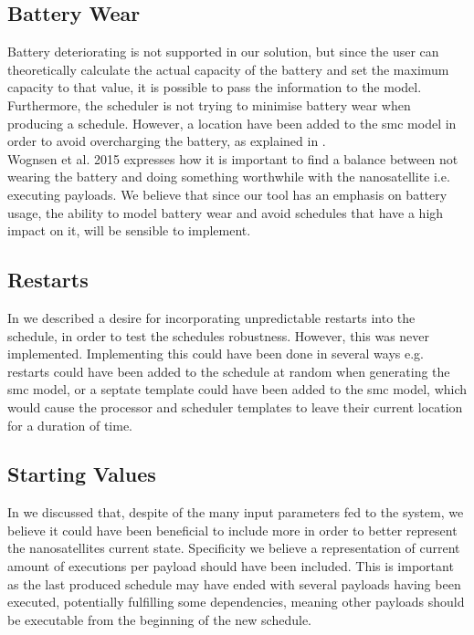 \subsection*{Battery Wear}
Battery deteriorating is not supported in our solution, but since the user can theoretically calculate the actual capacity of the battery and set the maximum capacity to that value, it is possible to pass the information to the model. Furthermore, the scheduler is not trying to minimise battery wear when producing a schedule. However, a location have been added to the \gls{smc} model in order to avoid overcharging the battery, as explained in .\\
Wognsen et al. 2015\cite{score_function} expresses how it is important to find a balance between not wearing the battery and doing something worthwhile with the nanosatellite i.e. executing payloads. We believe that since our tool has an emphasis on battery usage, the ability to model battery wear and avoid schedules that have a high impact on it, will be sensible to implement. 

\subsection*{Restarts}
In  we described a desire for incorporating unpredictable restarts into the schedule, in order to test the schedules robustness. However, this was never implemented. Implementing this could have been done in several ways e.g. restarts could have been added to the schedule at random when generating the \gls{smc} model, or a septate template could have been added to the \gls{smc} model, which would cause the processor and scheduler templates to leave their current location for a duration of time.

\subsection*{Starting Values} \label{ssec:start_val}
In  we discussed that, despite of the many input parameters fed to the system, we believe it could have been beneficial to include more in order to better represent the nanosatellites current state. Specificity we believe a representation of current amount of executions per payload should have been included. This is important as the last produced schedule may have ended with several payloads having been executed, potentially fulfilling some dependencies, meaning other payloads should be executable from the beginning of the new schedule.

